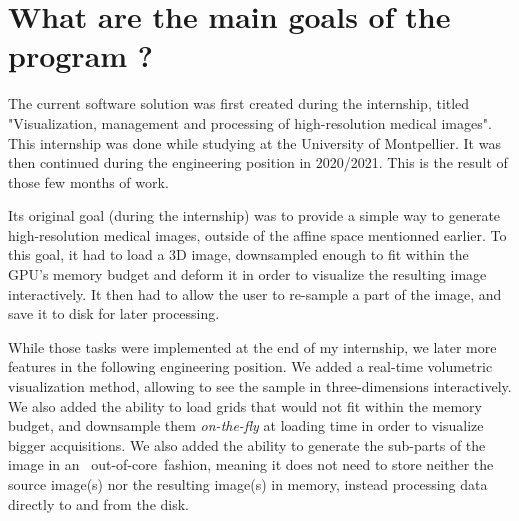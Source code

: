 \section{What are the main goals of the program ?}\label{text:01_intro:01_goals}
{

	The current software solution was first created during the internship, titled "Visualization, management and processing of high-resolution medical images". This internship was done while studying at the University of Montpellier. It was then continued during the engineering position in 2020/2021. This is the result of those few months of work.

	Its original goal (during the internship) was to provide a simple way to generate high-resolution medical images, outside of the affine space mentionned earlier. To this goal, it had to load a 3D image, downsampled enough to fit within the GPU's memory budget and deform it in order to visualize the resulting image interactively. It then had to allow the user to re-sample a part of the image, and save it to disk for later processing.


	While those tasks were implemented at the end of my internship, we later more features in the following engineering position. We added a real-time volumetric visualization method, allowing to see the sample in three-dimensions interactively. We also added the ability to load grids that would not fit within the memory budget, and downsample them \textit{on-the-fly} at loading time in order to visualize bigger acquisitions. We also added the ability to generate the sub-parts of the image in an \guillemotleft~out-of-core~\guillemotright fashion, meaning it does not need to store neither the source image(s) nor the resulting image(s) in memory, instead processing data directly to and from the disk.
}

